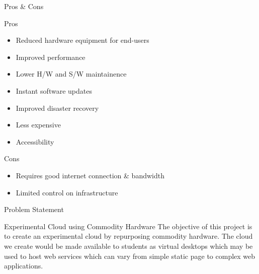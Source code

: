 \begin{frame}{Pros \& Cons}
    \begin{block}{Pros}
        \begin{itemize}
            \item Reduced hardware equipment for end-users
            \item Improved performance
            \item Lower H/W and S/W maintainence
            \item Instant software updates
            \item Improved disaster recovery
            \item Less expensive
            \item Accessibility
        \end{itemize}
    \end{block}

    \begin{block}{Cons}
        \begin{itemize}
            \item Requires good internet connection \& bandwidth
            \item Limited control on infrastructure
        \end{itemize}
    \end{block}
\end{frame}

\begin{frame}{Problem Statement}
    \begin{block}{Experimental Cloud using Commodity Hardware}
        The objective of this project is to create an experimental cloud by repurposing commodity hardware. The cloud we create would be made available to students as virtual desktops which may be used to host web services which can vary from simple static page to complex web applications.
    \end{block}
\end{frame}
